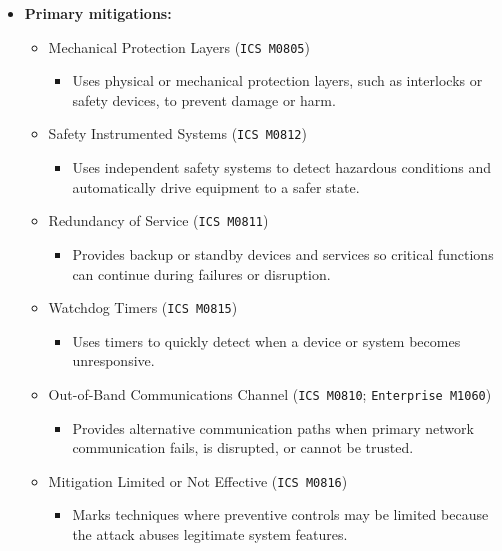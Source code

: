 \documentclass[10pt,a4paper,oneside]{report}
\begin{document}
\begin{itemize}
\item \textbf{Primary mitigations:}
\begin{itemize}
\item Mechanical Protection Layers (\texttt{ICS M0805})
\begin{itemize}
\item Uses physical or mechanical protection layers, such as interlocks or safety devices, to prevent damage or harm.
\end{itemize}
\item Safety Instrumented Systems (\texttt{ICS M0812})
\begin{itemize}
\item Uses independent safety systems to detect hazardous conditions and automatically drive equipment to a safer state.
\end{itemize}
\item Redundancy of Service (\texttt{ICS M0811})
\begin{itemize}
\item Provides backup or standby devices and services so critical functions can continue during failures or disruption.
\end{itemize}
\item Watchdog Timers (\texttt{ICS M0815})
\begin{itemize}
\item Uses timers to quickly detect when a device or system becomes unresponsive.
\end{itemize}
\item Out-of-Band Communications Channel (\texttt{ICS M0810}; \texttt{Enterprise M1060})
\begin{itemize}
\item Provides alternative communication paths when primary network communication fails, is disrupted, or cannot be trusted.
\end{itemize}
\item Mitigation Limited or Not Effective (\texttt{ICS M0816})
\begin{itemize}
\item Marks techniques where preventive controls may be limited because the attack abuses legitimate system features.
\end{itemize}
\end{itemize}
\end{itemize}
\end{document}

